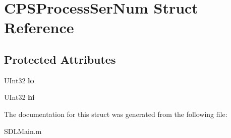 \hypertarget{struct_c_p_s_process_ser_num}{
\section{CPSProcessSerNum Struct Reference}
\label{struct_c_p_s_process_ser_num}
}
\subsection*{Protected Attributes}
\begin{DoxyCompactItemize}
\item 
\hypertarget{struct_c_p_s_process_ser_num_a7b6592ad5ec45fc2d77ba8f323a76afc}{
UInt32 {\bfseries lo}}
\label{struct_c_p_s_process_ser_num_a7b6592ad5ec45fc2d77ba8f323a76afc}

\item 
\hypertarget{struct_c_p_s_process_ser_num_ae052a7253c1a9b8c2c79a3053761f82c}{
UInt32 {\bfseries hi}}
\label{struct_c_p_s_process_ser_num_ae052a7253c1a9b8c2c79a3053761f82c}

\end{DoxyCompactItemize}


The documentation for this struct was generated from the following file:\begin{DoxyCompactItemize}
\item 
SDLMain.m\end{DoxyCompactItemize}
